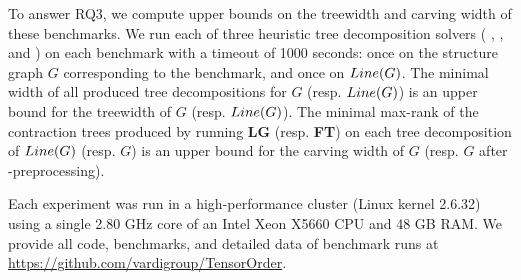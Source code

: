 

To answer RQ3, we compute upper bounds on the treewidth and carving width of these benchmarks. We run each of three heuristic tree decomposition solvers ( \cite{Tamaki17},  \cite{HS18}, and  \cite{AMW17}) on each benchmark with a timeout of 1000 seconds: once on the structure graph $G$ corresponding to the benchmark, and once on $Line(G)$. The minimal width of all produced tree decompositions for $G$ (resp. $Line(G)$) is an upper bound for the treewidth of $G$ (resp. $Line(G)$). The minimal max-rank of the contraction trees produced by running \textbf{LG} (resp. \textbf{FT}) on each tree decomposition of $Line(G)$ (resp. $G$) is an upper bound for the carving width of $G$ (resp. $G$ after -preprocessing).

Each experiment was run in a high-performance cluster (Linux kernel 2.6.32) using a single 2.80 GHz core of an Intel Xeon X5660 CPU and 48 GB RAM. We provide all code, benchmarks, and detailed data of benchmark runs at \url{https://github.com/vardigroup/TensorOrder}.




